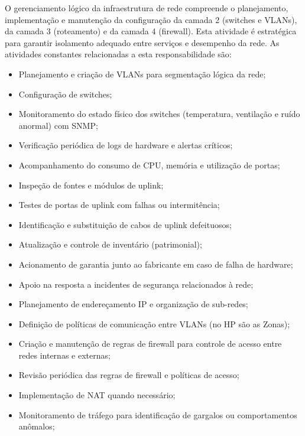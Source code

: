 O gerenciamento lógico da infraestrutura de rede compreende o planejamento, implementação e manutenção da configuração da camada 2 (switches e VLANs), da camada 3 (roteamento) e da camada 4 (firewall). Esta atividade é estratégica para garantir isolamento adequado entre serviços e desempenho da rede. As atividades constantes relacionadas a esta responsabilidade são: 

\begin{itemize} 
    \item Planejamento e criação de VLANs para segmentação lógica da rede; 
    \item Configuração de switches;
    \item Monitoramento do estado físico dos switches (temperatura, ventilação e ruído anormal) com SNMP;
    \item Verificação periódica de logs de hardware e alertas críticos;
    \item Acompanhamento do consumo de CPU, memória e utilização de portas;
    \item Inspeção de fontes e módulos de uplink;
    \item Testes de portas de uplink com falhas ou intermitência;
    \item Identificação e substituição de cabos de uplink defeituosos;
    \item Atualização e controle de inventário (patrimonial);
    \item Acionamento de garantia junto ao fabricante em caso de falha de hardware;
    \item Apoio na resposta a incidentes de segurança relacionados à rede; 
    \item Planejamento de endereçamento IP e organização de sub-redes;
    \item Definição de políticas de comunicação entre VLANs (no HP são as Zonas);
    \item Criação e manutenção de regras de firewall para controle de acesso entre redes internas e externas;
    \item Revisão periódica das regras de firewall e políticas de acesso;
    \item Implementação de NAT quando necessário;
    \item Monitoramento de tráfego para identificação de gargalos ou comportamentos anômalos;
\end{itemize}

